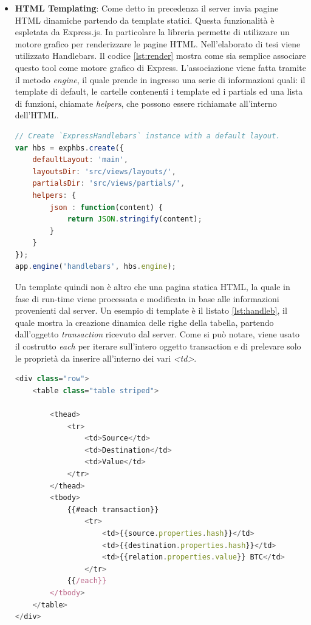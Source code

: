\begin{itemize}
\item \textbf{HTML Templating}: Come detto in precedenza il server invia pagine HTML dinamiche partendo da template statici. Questa funzionalità è espletata da Express.js. In particolare la libreria permette di utilizzare un motore grafico per renderizzare le pagine HTML. Nell'elaborato di tesi viene utilizzato Handlebars. Il codice \ref{lst:render} mostra come sia semplice associare questo tool come motore grafico di Express. L'associazione viene fatta tramite il metodo \textit{engine}, il quale prende in ingresso una serie di informazioni quali: il template di default, le cartelle contenenti i template ed i partials ed una lista di funzioni, chiamate \textit{helpers}, che possono essere richiamate all'interno dell'HTML. 

\begin{lstlisting}[language=Javascript, label=lst:render, caption={Associazione Express-Handelbars.}]
// Create `ExpressHandlebars` instance with a default layout.
var hbs = exphbs.create({
    defaultLayout: 'main',
    layoutsDir: 'src/views/layouts/',
    partialsDir: 'src/views/partials/',
    helpers: {
        json : function(content) {
            return JSON.stringify(content);
        }
    }
});
app.engine('handlebars', hbs.engine);
\end{lstlisting}

Un template quindi non è altro che una pagina statica HTML, la quale in fase di run-time viene processata e modificata in base alle informazioni provenienti dal server. Un esempio di template è il listato \ref{lst:handleb}, il quale mostra la creazione dinamica delle righe della tabella, partendo dall'oggetto \textit{transaction} ricevuto dal server. Come si può notare, viene usato il costrutto \textit{each} per iterare sull'intero oggetto transaction e di prelevare solo le proprietà da inserire all'interno dei vari \textit{<td>}.

\begin{lstlisting}[language=Javascript, label=lst:handleb, caption={Template Handlebars.}]
<div class="row">
    <table class="table striped">

        <thead>
            <tr>
                <td>Source</td>
                <td>Destination</td>
                <td>Value</td>
            </tr>
        </thead>
        <tbody>
            {{#each transaction}}
                <tr>
                    <td>{{source.properties.hash}}</td>
                    <td>{{destination.properties.hash}}</td>
                    <td>{{relation.properties.value}} BTC</td>
                </tr>
            {{/each}}
        </tbody>
    </table>
</div>
\end{lstlisting}


\end{itemize}
